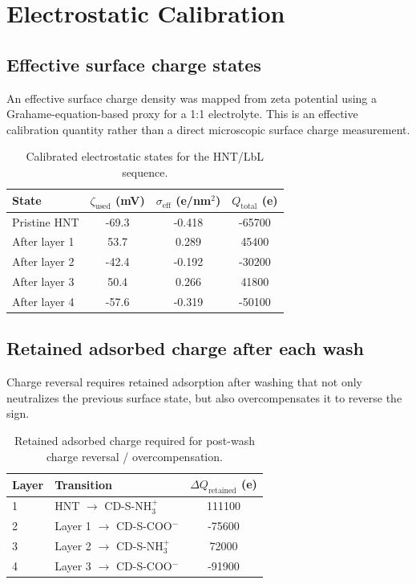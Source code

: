 \documentclass[11pt]{article}
\begin{document}
\section{Electrostatic Calibration}

\subsection{Effective surface charge states}
An effective surface charge density was mapped from zeta potential using a Grahame-equation-based proxy for a 1:1 electrolyte. This is an effective calibration quantity rather than a direct microscopic surface charge measurement.

\begin{table}[H]
\centering
\caption{Calibrated electrostatic states for the HNT/LbL sequence.}
\begin{tabular}{l
                S[table-format=2.1]
                S[table-format=1.3]
                S[table-format=6.0]}
\toprule
State & {$\zeta_{\mathrm{used}}$ (mV)} & {$\sigma_{\mathrm{eff}}$ (e/nm$^2$)} & {$Q_{\mathrm{total}}$ (e)} \\
\midrule
Pristine HNT & -69.3 & -0.418 & -65700 \\
After layer 1 & 53.7 & 0.289 & 45400 \\
After layer 2 & -42.4 & -0.192 & -30200 \\
After layer 3 & 50.4 & 0.266 & 41800 \\
After layer 4 & -57.6 & -0.319 & -50100 \\
\bottomrule
\end{tabular}
\label{tab:electrostatic_states}
\end{table}

\subsection{Retained adsorbed charge after each wash}
Charge reversal requires retained adsorption after washing that not only neutralizes the previous surface state, but also overcompensates it to reverse the sign.

\begin{table}[H]
\centering
\caption{Retained adsorbed charge required for post-wash charge reversal / overcompensation.}
\begin{tabular}{l l S[table-format=6.0]}
\toprule
Layer & Transition & {$\Delta Q_{\mathrm{retained}}$ (e)} \\
 & HNT $\rightarrow$ CD-S-NH$_3^+$ & 111100 \\
2 & Layer 1 $\rightarrow$ CD-S-COO$^-$ & -75600 \\
3 & Layer 2 $\rightarrow$ CD-S-NH$_3^+$ & 72000 \\
4 & Layer 3 $\rightarrow$ CD-S-COO$^-$ & -91900 \\
\bottomrule
\end{tabular}
\label{tab:retained_charge}
\end{table}
\end{document}
